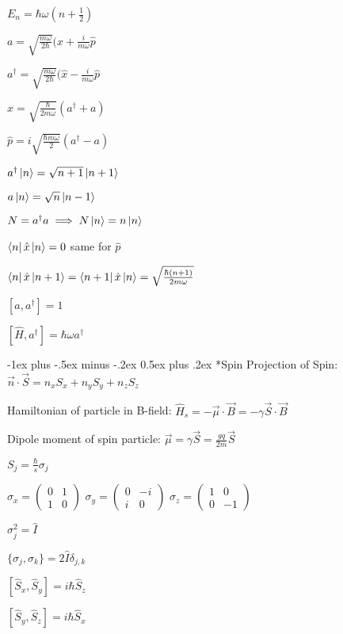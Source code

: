 \documentclass[10pt,landscape]{article}
\makeatletter
\renewcommand{\section}{\@startsection{section}{1}{0mm}%
                                {-1ex plus -.5ex minus -.2ex}%
                                {0.5ex plus .2ex}%
                                {\normalfont\large\bfseries}}
\makeatother
\begin{document}
\begin{multicols}{3}
$E_n = \hbar \omega (n + \frac{1}{2})$

$a = \sqrt{\frac{m\omega}{2\hbar}}(\hat{x} + \frac{i}{m\omega}\hat{p}$

$a^{\dagger} = \sqrt{\frac{m\omega}{2\hbar}}(\hat{x} - \frac{i}{m\omega}\hat{p}$

$\hat{x} = \sqrt{\frac{\hbar}{2m\omega}}(a^{\dagger} + a)$

$\hat{p} = i\sqrt{\frac{\hbar m\omega}{2}}(a^{\dagger} - a)$

$a^{\dagger}\ket{n} = \sqrt{n+1}\ket{n+1}$

$a\ket{n} = \sqrt{n}\ket{n-1}$

$N = a^{\dagger}a \implies N\ket{n} = n\ket{n}$

$\bra{n}\hat{x}\ket{n} = 0$ same for $\hat{p}$

$\bra{n}\hat{x}\ket{n+1} = \bra{n+1}\hat{x}\ket{n} = \sqrt{\frac{\hbar(n+1)}{2m\omega}}$

$[a,a^{\dagger}]=1$

$[\hat{H},a^{\dagger}] = \hbar\omega a^{\dagger}$

\section*{Spin}
Projection of Spin:
$\vec{n} \cdot \vec{S} = n_xS_x + n_yS_y + n_zS_z$

Hamiltonian of particle in B-field:
$\hat{H}_s = -\vec{\mu} \cdot \vec{B} = -\gamma \vec{S} \cdot \vec{B}$

Dipole moment of spin particle:
$\vec{\mu} = \gamma\vec{S} = \frac{gq}{2m}\vec{S}$

$S_j = \frac{\hbar}{s} \sigma_j$

$\sigma_x = 
\begin{pmatrix}
0 & 1 \\
1 & 0
\end{pmatrix}$
$\sigma_y = 
\begin{pmatrix}
0 & -i \\
i & 0
\end{pmatrix}$
$\sigma_z = 
\begin{pmatrix}
1 & 0 \\
0 & -1
\end{pmatrix}$

$\sigma_j^2 = \hat{I}$

$\{\sigma_j,\sigma_k\} = 2\hat{I}\delta_{j,k}$

$[\hat{S}_x, \hat{S}_y] = i\hbar\hat{S}_z$

$[\hat{S}_y, \hat{S}_z] = i\hbar\hat{S}_x$


\end{multicols}
\end{document}
